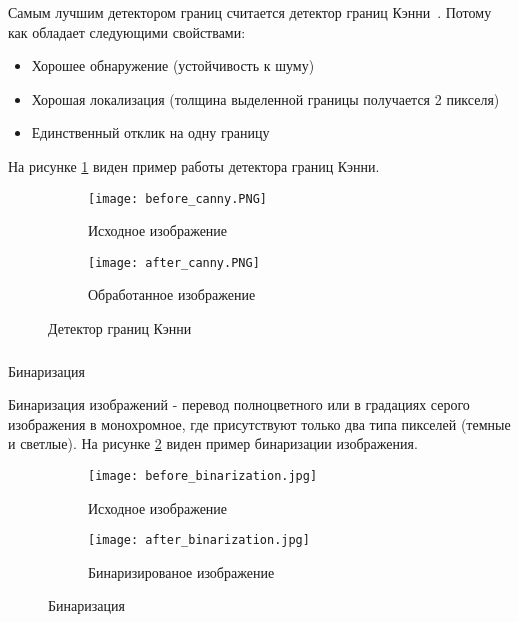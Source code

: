 Самым лучшим детектором границ считается детектор границ Кэнни~\cite{canny_edge_detector}. Потому как обладает следующими свойствами:
\begin{itemize}
  \item Хорошее обнаружение (устойчивость к шуму)
  \item Хорошая локализация (толщина выделенной границы получается 2 пикселя)
  \item Единственный отклик на одну границу
\end{itemize}

На рисунке \ref{fig:domain:image_processing:edges_detection:canny} виден пример работы детектора границ Кэнни. 

\begin{figure}[ht]
\centering
  \begin{subfigure}[b]{0.48\textwidth} 
    \centering
    \texttt{[image: before\_canny.PNG]}  
    \caption{Исходное изображение}
  \end{subfigure}
  \begin{subfigure}[b]{0.48\textwidth} 
    \centering
    \texttt{[image: after\_canny.PNG]}  
    \caption{Обработанное изображение}
  \end{subfigure}
  \caption{Детектор границ Кэнни}
  \label{fig:domain:image_processing:edges_detection:canny}
\end{figure}


\subsubsection{}
\label{sub:temp:image_processing:binary}
Бинаризация

Бинаризация изображений - перевод полноцветного или в градациях серого изображения в монохромное, где присутствуют только два типа пикселей (темные и светлые)\cite{binary_image}. На рисунке \ref{fig:domain:image_processing:binary:binarization} виден пример бинаризации изображения.

\begin{figure}[ht]
\centering
  \begin{subfigure}[b]{0.48\textwidth} 
    \centering
    \texttt{[image: before\_binarization.jpg]}  
    \caption{Исходное изображение}
  \end{subfigure}
  \begin{subfigure}[b]{0.48\textwidth} 
    \centering
    \texttt{[image: after\_binarization.jpg]}  
    \caption{Бинаризированое изображение}
  \end{subfigure}
  \caption{Бинаризация}
  \label{fig:domain:image_processing:binary:binarization}
\end{figure}

